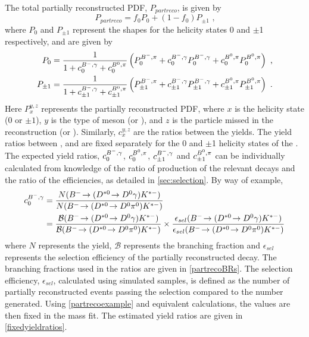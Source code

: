 The total partially reconstructed PDF, $P_{partreco}$, is given by
\begin{equation}
P_{partreco} = f_0P_0 + (1 - f_0)P_{\pm 1} \text{ ,}
\label{partrecofunction}
\end{equation}
where $P_0$ and $P_{\pm 1}$ represent the shapes for the \Dstar helicity states 0 and $\pm$1 respectively, and are given by
\begin{align*}
P_0 &= \frac{1}{1 + c^{{{{B}^-}},\gamma}_0 + c^{{{B}^0},\pi}_0} \left( P^{{{{B}^-}},\pi}_0 + c^{{{{B}^-}},\gamma}_0P^{{{{B}^-}},\gamma}_0 + c^{{{B}^0},\pi}_0P^{{{B}^0},\pi}_0 \right) \text{ ,} \\
P_{\pm 1} &= \frac{1}{1 + c^{{{{B}^-}},\gamma}_{\pm 1} + c^{{{B}^0},\pi}_{\pm 1}} \left( P^{{{{B}^-}},\pi}_{\pm 1} + c^{{{{B}^-}},\gamma}_{\pm 1}P^{{{{B}^-}},\gamma}_{\pm 1} + c^{{{B}^0},\pi}_{\pm 1}P^{{{B}^0},\pi}_{\pm 1} \right) \text{ .}
\end{align*}
Here $P_x^{y,z}$ represents the partially reconstructed PDF, where $x$ is the \Dstar helicity state ($0$ or $\pm 1$), $y$ is the type of \B meson (\Bm or \Bd), and $z$ is the particle missed in the reconstruction (\pion or \Pgamma). Similarly, $c_x^{y,z}$ are the ratios between the yields. The yield ratios between \decay{\Bm}{(\decay{\Dstarz}{\Dz[\piz]})\Kstarm}, \decay{\Bm}{(\decay{\Dstarz}{\Dz[\gamma]})\Kstarm} and \decay{\Bd}{(\decay{\Dstarp}{\Dz[\pip]})\Kstarm} are fixed separately for the 0 and $\pm$1 helicity states of the \Dstar. The expected yield ratios, $c^{{{{B}^-}},\gamma}_0$, $c^{{{B}^0},\pi}_0$, $c^{{{{B}^-}},\gamma}_{\pm 1}$ and $c^{{{B}^0},\pi}_{\pm 1}$ can be individually calculated from knowledge of the ratio of production of the relevant decays and the ratio of the efficiencies, as detailed in \sect\ref{sec:selection}. By way of example, 
\begin{align}
c^{\Bm,\gamma}_0 &= \frac{N(\decay{\Bm}{(\decay{\Dstarz}{\Dz\gamma})\Kstarm})}{N(\decay{\Bm}{(\decay{\Dstarz}{\Dz\piz})\Kstarm})} \nonumber \\ 
&= \frac{\mathcal{B}(\decay{\Bm}{(\decay{\Dstarz}{\Dz\gamma})\Kstarm})}{\mathcal{B}(\decay{\Bm}{(\decay{\Dstarz}{\Dz\piz})\Kstarm})} \times \frac{\epsilon_{sel}(\decay{\Bm}{(\decay{\Dstarz}{\Dz\gamma})\Kstarm})}{\epsilon_{sel}(\decay{\Bm}{(\decay{\Dstarz}{\Dz\piz})\Kstarm})}
\label{partrecoexample}
\end{align}
where $N$ represents the yield, $\mathcal{B}$ represents the branching fraction and $\epsilon_{sel}$ represents the selection efficiency of the partially reconstructed decay. The branching fractions used in the ratios are given in \tab\ref{partrecoBRs}. The selection efficiency, $\epsilon_{sel}$, calculated using simulated samples, is defined as the number of partially reconstructed events passing the selection compared to the number generated. Using \eqn\ref{partrecoexample} and equivalent calculations, the values are then fixed in the mass fit. The estimated yield ratios are given in \tab\ref{fixedyieldratios}. 

